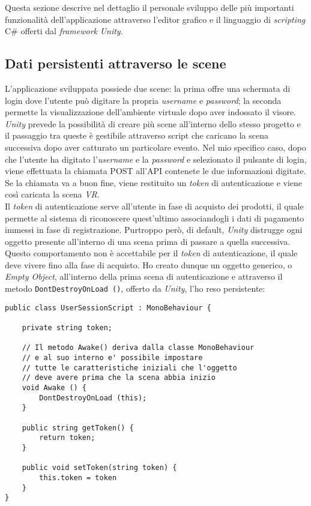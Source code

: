 Questa sezione descrive nel dettaglio il personale sviluppo delle più importanti funzionalità dell'applicazione attraverso l'editor grafico e il linguaggio di \textit{scripting} C\# offerti dal \textit{framework} \textit{Unity}.


\subsection{Dati persistenti attraverso le scene}

L'applicazione sviluppata possiede due scene: la prima offre una schermata di login dove l'utente può digitare la propria \textit{username} e \textit{password}; la seconda permette la visualizzazione dell'ambiente virtuale dopo aver indossato il visore. \textit{Unity} prevede la possibilità di creare più scene all'interno dello stesso progetto e il passaggio tra queste è gestibile attraverso script che caricano la scena successiva dopo aver catturato un particolare evento. Nel mio specifico caso, dopo che l'utente ha digitato l'\textit{username} e la \textit{password} e selezionato il pulsante di login, viene effettuata la chiamata POST all'API contenete le due informazioni digitate. Se la chiamata va a buon fine, viene restituito un \textit{token} di autenticazione e viene così caricata la scena \textit{VR}. \\
Il \textit{token} di autenticazione serve all'utente in fase di acquisto dei prodotti, il quale permette al sistema di riconoscere quest'ultimo associandogli i dati di pagamento immessi in fase di registrazione. Purtroppo però, di default, \textit{Unity} distrugge ogni oggetto presente all'interno di una scena prima di passare a quella successiva. Questo comportamento non è accettabile per il \textit{token} di autenticazione, il quale deve vivere fino alla fase di acquisto. Ho creato dunque un oggetto generico, o \textit{Empty Object}, all'interno della prima scena di autenticazione e attraverso il metodo \texttt{DontDestroyOnLoad ()}, offerto da \textit{Unity}, l'ho reso persistente:

\begin{lstlisting}[style=MyCStyle]
public class UserSessionScript : MonoBehaviour {

	private string token;

	// Il metodo Awake() deriva dalla classe MonoBehaviour
	// e al suo interno e' possibile impostare
	// tutte le caratteristiche iniziali che l'oggetto
	// deve avere prima che la scena abbia inizio
	void Awake () {
		DontDestroyOnLoad (this);
	}
	
	public string getToken() {
		return token;
	}
	
	public void setToken(string token) {
		this.token = token
	}
}
\end{lstlisting}

